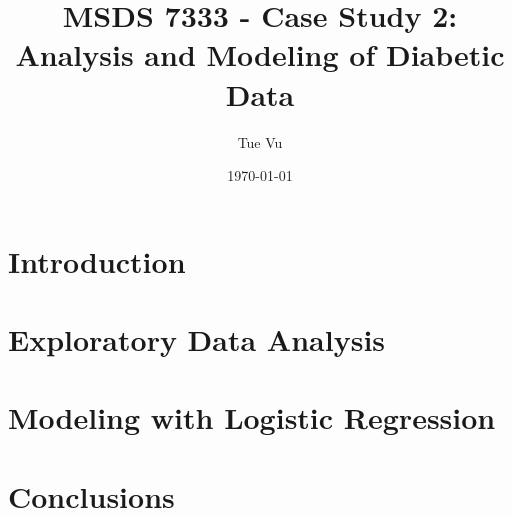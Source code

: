\documentclass[12pt,a4paper]{report}
\title{\textbf{MSDS 7333 - Case Study 2: \\ Analysis and Modeling of Diabetic Data}}
\author{Tue Vu}
\date{\today}
\begin{document}
\maketitle
\tableofcontents

\chapter{Introduction}


\chapter{Exploratory Data Analysis}


\chapter{Modeling with Logistic Regression}


\chapter{Conclusions}

\end{document}
